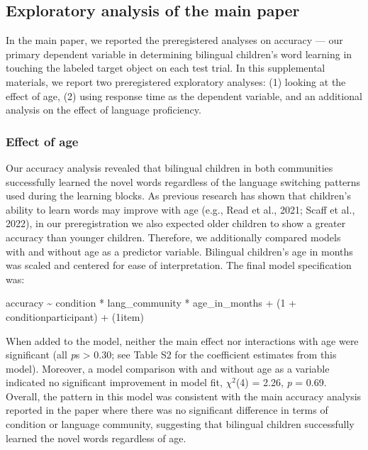 \documentclass[
  man,floatsintext]{apa7}
\begin{document}
\hypertarget{exploratory-analysis-of-the-main-paper}{%
\subsection{Exploratory analysis of the main paper}\label{exploratory-analysis-of-the-main-paper}}

In the main paper, we reported the preregistered analyses on accuracy --- our primary dependent variable in determining bilingual children's word learning in touching the labeled target object on each test trial. In this supplemental materials, we report two preregistered exploratory analyses: (1) looking at the effect of age, (2) using response time as the dependent variable, and an additional analysis on the effect of language proficiency.

\hypertarget{effect-of-age}{%
\subsubsection{Effect of age}\label{effect-of-age}}

Our accuracy analysis revealed that bilingual children in both communities successfully learned the novel words regardless of the language switching patterns used during the learning blocks. As previous research has shown that children's ability to learn words may improve with age (e.g., Read et al., 2021; Scaff et al., 2022), in our preregistration we also expected older children to show a greater accuracy than younger children. Therefore, we additionally compared models with and without age as a predictor variable. Bilingual children's age in months was scaled and centered for ease of interpretation. The final model specification was:

accuracy \textasciitilde{} condition * lang\_community * age\_in\_months + (1 + condition\textbar participant) + (1\textbar item)

\noindent When added to the model, neither the main effect nor interactions with age were significant (all \emph{p}s \textgreater{} 0.30; see Table S2 for the coefficient estimates from this model). Moreover, a model comparison with and without age as a variable indicated no significant improvement in model fit, \(\chi^2\)(4) = 2.26, \emph{p} = 0.69. Overall, the pattern in this model was consistent with the main accuracy analysis reported in the paper where there was no significant difference in terms of condition or language community, suggesting that bilingual children successfully learned the novel words regardless of age.
\end{document}

